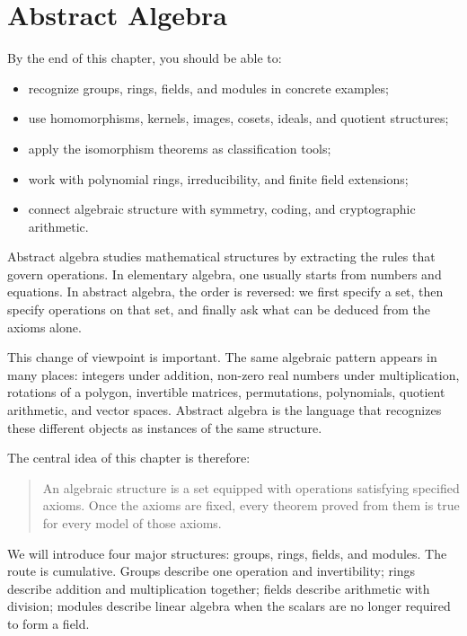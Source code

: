 \chapter{Abstract Algebra}

\begin{learningobjectives}
By the end of this chapter, you should be able to:
\begin{itemize}
    \item recognize groups, rings, fields, and modules in concrete examples;
    \item use homomorphisms, kernels, images, cosets, ideals, and quotient structures;
    \item apply the isomorphism theorems as classification tools;
    \item work with polynomial rings, irreducibility, and finite field extensions;
    \item connect algebraic structure with symmetry, coding, and cryptographic arithmetic.
\end{itemize}
\end{learningobjectives}

Abstract algebra studies mathematical structures by extracting the rules that govern operations. In elementary algebra, one usually starts from numbers and equations. In abstract algebra, the order is reversed: we first specify a set, then specify operations on that set, and finally ask what can be deduced from the axioms alone.

This change of viewpoint is important. The same algebraic pattern appears in many places: integers under addition, non-zero real numbers under multiplication, rotations of a polygon, invertible matrices, permutations, polynomials, quotient arithmetic, and vector spaces. Abstract algebra is the language that recognizes these different objects as instances of the same structure.

The central idea of this chapter is therefore:

\begin{quote}
    An algebraic structure is a set equipped with operations satisfying specified axioms. Once the axioms are fixed, every theorem proved from them is true for every model of those axioms.
\end{quote}

We will introduce four major structures: groups, rings, fields, and modules. The route is cumulative. Groups describe one operation and invertibility; rings describe addition and multiplication together; fields describe arithmetic with division; modules describe linear algebra when the scalars are no longer required to form a field.

